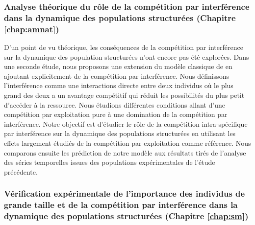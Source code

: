 \subsubsection{Analyse théorique du rôle de la compétition par interférence dans
la dynamique des populations structurées (Chapitre \ref{chap:amnat})}

D'un point de vu théorique, les conséquences de la compétition par interférence
sur la dynamique des population structurées n'ont encore pas été explorées. Dans
une seconde étude, nous proposons une extension du modèle classique de
\textcites{kooijman1984a} en ajoutant explicitement de la compétition par
interférence. Nous définissons l'interférence comme une interactions directe
entre deux individus où le plus grand des deux a un avantage compétitif qui
réduit les possibilités du plus petit d'accéder à la ressource. Nous étudions
différentes conditions allant d'une compétition par exploitation pure à une
domination de la compétition par interférence. Notre objectif est d'étudier le
rôle de la compétition intra-spécifique par interférence sur la dynamique des
populations structurées en utilisant les effets largement étudiés de la
compétition par exploitation comme référence. Nous comparons ensuite les
prédiction de notre modèle aux résultats tirés de l'analyse des séries
temporelles issues des populations expérimentales de l'étude précédente.

\subsubsection{Vérification expérimentale de l'importance des individus de
grande taille et de la compétition par interférence dans la dynamique des
populations structurées (Chapitre \ref{chap:sm})}

